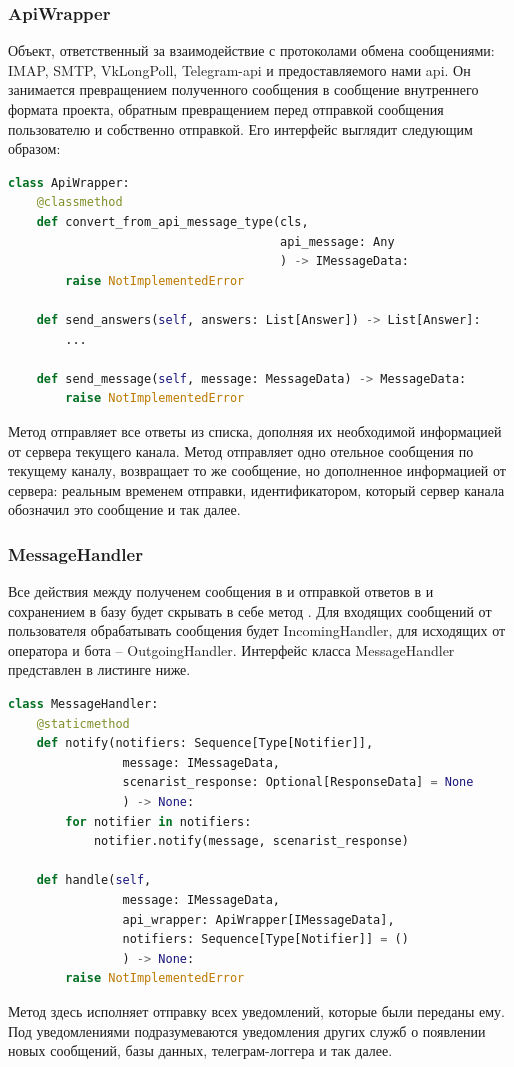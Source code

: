     \subsubsection*{ApiWrapper}
    Объект, ответственный за взаимодействие с протоколами обмена сообщениями: IMAP, SMTP, VkLongPoll,
    Telegram-api и предоставляемого нами api.
    Он занимается превращением полученного сообщения в сообщение внутреннего формата проекта,
    обратным превращением перед отправкой сообщения пользователю и собственно отправкой.
    Его интерфейс выглядит следующим образом:
\begin{lstlisting}[language=Python]
class ApiWrapper:
    @classmethod
    def convert_from_api_message_type(cls,
                                      api_message: Any
                                      ) -> IMessageData:
        raise NotImplementedError

    def send_answers(self, answers: List[Answer]) -> List[Answer]:
        ...

    def send_message(self, message: MessageData) -> MessageData:
        raise NotImplementedError
\end{lstlisting}
    Метод  отправляет все ответы из списка, дополняя их
    необходимой информацией от сервера текущего канала. 
    Метод  отправляет одно отельное сообщения по текущему каналу,
    возвращает то же сообщение, но дополненное информацией от сервера: реальным временем
    отправки, идентификатором, который сервер канала обозначил это сообщение и так далее.

    \subsubsection*{MessageHandler}
    Все действия между полученем сообщения в  и отправкой ответов
    в  и сохранением в базу будет скрывать в себе метод
    . Для входящих сообщений от пользователя обрабатывать
    сообщения будет IncomingHandler, для исходящих от оператора и бота -- OutgoingHandler.
    Интерфейс класса MessageHandler представлен в листинге ниже.
\begin{lstlisting}[language=Python]
class MessageHandler:
    @staticmethod
    def notify(notifiers: Sequence[Type[Notifier]],
                message: IMessageData,
                scenarist_response: Optional[ResponseData] = None
                ) -> None:
        for notifier in notifiers:
            notifier.notify(message, scenarist_response)

    def handle(self,
                message: IMessageData,
                api_wrapper: ApiWrapper[IMessageData],
                notifiers: Sequence[Type[Notifier]] = ()
                ) -> None:
        raise NotImplementedError
\end{lstlisting}
    Метод  здесь исполняет отправку всех уведомлений,
    которые были переданы ему. Под уведомлениями подразумеваются уведомления других служб
    о появлении новых сообщений, базы данных, телеграм-логгера и так далее.

